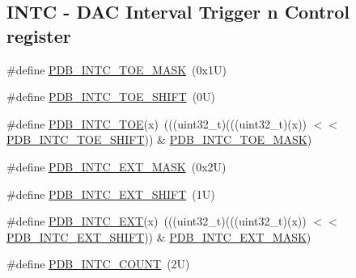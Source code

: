 \subsection*{I\+N\+TC -\/ D\+AC Interval Trigger n Control register}
\begin{DoxyCompactItemize}
\item 
\#define \mbox{\hyperlink{group___p_d_b___register___masks_ga72fcf50548a0ad908e68c9dd67e61c2a}{P\+D\+B\+\_\+\+I\+N\+T\+C\+\_\+\+T\+O\+E\+\_\+\+M\+A\+SK}}~(0x1\+U)
\item 
\#define \mbox{\hyperlink{group___p_d_b___register___masks_ga48ed5e2759aea8d4b6a4a47f1993cacc}{P\+D\+B\+\_\+\+I\+N\+T\+C\+\_\+\+T\+O\+E\+\_\+\+S\+H\+I\+FT}}~(0\+U)
\item 
\#define \mbox{\hyperlink{group___p_d_b___register___masks_gad19e5e45ebeabbc6a5bd65f68917ebe4}{P\+D\+B\+\_\+\+I\+N\+T\+C\+\_\+\+T\+OE}}(x)~(((uint32\+\_\+t)(((uint32\+\_\+t)(x)) $<$$<$ \mbox{\hyperlink{group___p_d_b___register___masks_ga48ed5e2759aea8d4b6a4a47f1993cacc}{P\+D\+B\+\_\+\+I\+N\+T\+C\+\_\+\+T\+O\+E\+\_\+\+S\+H\+I\+FT}})) \& \mbox{\hyperlink{group___p_d_b___register___masks_ga72fcf50548a0ad908e68c9dd67e61c2a}{P\+D\+B\+\_\+\+I\+N\+T\+C\+\_\+\+T\+O\+E\+\_\+\+M\+A\+SK}})
\item 
\#define \mbox{\hyperlink{group___p_d_b___register___masks_ga012fb0606d68eca77a9b15c2b8b8c995}{P\+D\+B\+\_\+\+I\+N\+T\+C\+\_\+\+E\+X\+T\+\_\+\+M\+A\+SK}}~(0x2\+U)
\item 
\#define \mbox{\hyperlink{group___p_d_b___register___masks_ga94b6fffc0fb61e58e2436696dc674340}{P\+D\+B\+\_\+\+I\+N\+T\+C\+\_\+\+E\+X\+T\+\_\+\+S\+H\+I\+FT}}~(1\+U)
\item 
\#define \mbox{\hyperlink{group___p_d_b___register___masks_gaf418115d96a5370c7d5f4ef1364d621e}{P\+D\+B\+\_\+\+I\+N\+T\+C\+\_\+\+E\+XT}}(x)~(((uint32\+\_\+t)(((uint32\+\_\+t)(x)) $<$$<$ \mbox{\hyperlink{group___p_d_b___register___masks_ga94b6fffc0fb61e58e2436696dc674340}{P\+D\+B\+\_\+\+I\+N\+T\+C\+\_\+\+E\+X\+T\+\_\+\+S\+H\+I\+FT}})) \& \mbox{\hyperlink{group___p_d_b___register___masks_ga012fb0606d68eca77a9b15c2b8b8c995}{P\+D\+B\+\_\+\+I\+N\+T\+C\+\_\+\+E\+X\+T\+\_\+\+M\+A\+SK}})
\item 
\#define \mbox{\hyperlink{group___p_d_b___register___masks_ga04012dae1dfa9fb91ee9c105d71fadef}{P\+D\+B\+\_\+\+I\+N\+T\+C\+\_\+\+C\+O\+U\+NT}}~(2\+U)
\end{DoxyCompactItemize}
